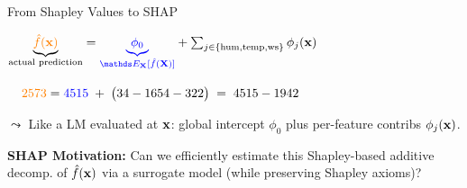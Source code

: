 \documentclass[10pt,compress,t,notes=noshow, xcolor=table]{beamer}
\begin{document}
\begin{frame}{From Shapley Values to SHAP}
\medskip

\centerline{$
\underbrace{{\color{orange} \fh(\xv)}}_{\text{actual prediction}}
={\color{blue} \underbrace{\phi_0}_{\E_{\mathbf X}[\fh(\mathbf X)]}}
+\sum_{j\in\{\text{hum},\text{temp},\text{ws}\}}\phi_j(\xv)
$}
\medskip
\centerline{$
\phantom{=} \; {\color{orange} 2573}
= {\color{blue} 4515}
\;+\;
\bigl(34 -1654 - 322\bigr)
\;=\;4515-1942
$}
\medskip

\(\leadsto\) Like a LM evaluated at \(\mathbf{x}\): global intercept \(\phi_0\) plus per-feature contribs \(\phi_j(\mathbf{x})\).

\medskip



\textbf{SHAP Motivation:}
Can we efficiently estimate this Shapley-based additive decomp. of $\hat{f}(\mathbf{x})$ via a surrogate model (while preserving Shapley axioms)?

\end{frame}
\end{document}
